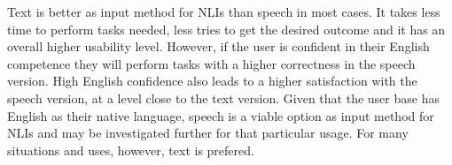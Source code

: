 Text is better as input method for NLIs than speech in most cases. It takes less time to perform tasks needed, less tries to get the desired outcome and it has an overall higher usability level. However, if the user is confident in their English competence they will perform tasks with a higher correctness in the speech version. High English confidence also leads to a higher satisfaction with the speech version, at a level close to the text version. Given that the user base has English as their native language, speech is a viable option as input method for NLIs and may be investigated further for that particular usage. For many situations and uses, however, text is prefered.